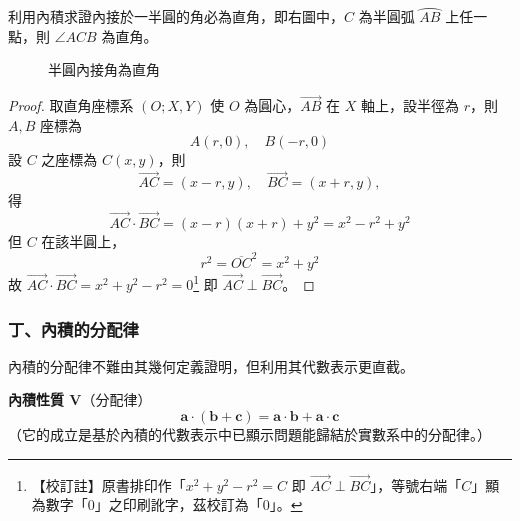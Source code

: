 \begin{example}
利用內積求證內接於一半圓的角必為直角，即右圖中，$C$ 為半圓弧 $\wideparen{AB}$ 上任一點，則 $\angle ACB$ 為直角。
\end{example}

\begin{figure}[H]
\centering
{}
\caption{半圓內接角為直角}
\label{fig:b3-fig3-41}
\end{figure}

\begin{proof}
取直角座標系 $(O; X, Y)$ 使 $O$ 為圓心，$\vec{AB}$ 在 $X$ 軸上，設半徑為 $r$，則 $A, B$ 座標為
\[ A(r, 0), \quad B(-r, 0) \]
設 $C$ 之座標為 $C(x, y)$，則
\[ \vec{AC} = (x - r, y), \quad \vec{BC} = (x + r, y), \]
得
\[ \vec{AC}\cdot\vec{BC} = (x - r)(x + r) + y^2 = x^2 - r^2 + y^2 \]
但 $C$ 在該半圓上，
\[ r^2 = \overline{OC}^2 = x^2 + y^2 \]
\label{note:b3-ch3-p116-ac-bc-zero}%
故 $\vec{AC}\cdot\vec{BC} = x^2 + y^2 - r^2 = 0$\footnote{【校訂註】原書排印作「$x^2+y^2-r^2 = C$ 即 $\vec{AC}\perp\vec{BC}$」，等號右端「$C$」顯為數字「$0$」之印刷訛字，茲校訂為「$0$」。} 即 $\vec{AC} \perp \vec{BC}$。\qedhere
\end{proof}

\subsubsection*{丁、內積的分配律}

內積的分配律不難由其幾何定義證明，但利用其代數表示更直截。

\textbf{內積性質 V}（分配律）
\[ \mathbf{a}\cdot(\mathbf{b} + \mathbf{c}) = \mathbf{a}\cdot\mathbf{b} + \mathbf{a}\cdot\mathbf{c} \]
（它的成立是基於內積的代數表示中已顯示問題能歸結於實數系中的分配律。）

